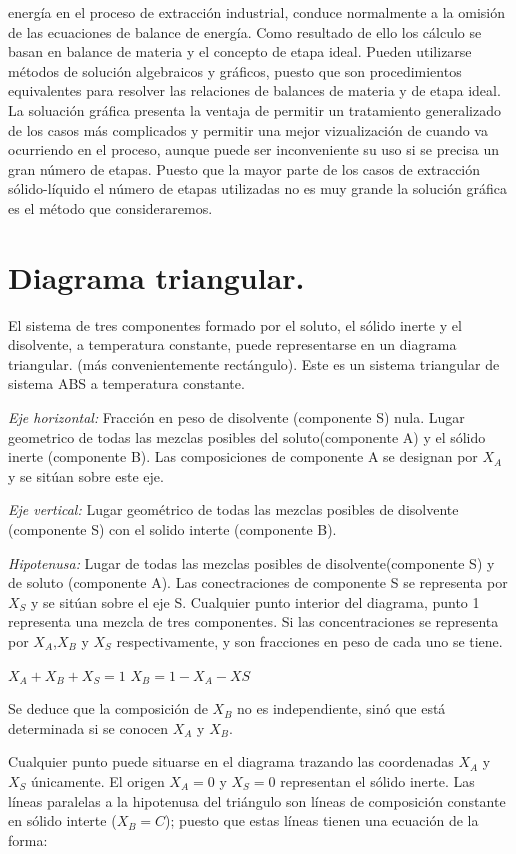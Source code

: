 \documentclass[12pt,openany]{book}
\begin{document}
energía en el proceso de extracción industrial, conduce normalmente a la omisión de las 
ecuaciones de balance de energía. Como resultado de ello los cálculo se basan en balance de materia y el concepto de etapa ideal.
Pueden utilizarse métodos de solución algebraicos y gráficos, puesto que son procedimientos equivalentes para resolver las relaciones de balances de materia y de etapa ideal.
La soluación gráfica presenta la ventaja de permitir un tratamiento generalizado de los casos más complicados y permitir una mejor vizualización de cuando va ocurriendo en el proceso,
aunque puede ser inconveniente su uso si se precisa un gran número de etapas. Puesto que la mayor parte de los casos de extracción sólido-líquido el 
número de etapas utilizadas no es muy grande la solución gráfica es el método que consideraremos.
\section{Diagrama triangular.}
El sistema de tres componentes formado por el soluto, el sólido inerte y el disolvente, a temperatura constante, puede representarse en un diagrama triangular.
(más convenientemente rectángulo).
Este es un sistema triangular de sistema ABS a temperatura constante.

\textit{Eje horizontal:} Fracción en peso de disolvente (componente S) nula. Lugar geometrico de todas las mezclas posibles del soluto(componente A) y el sólido inerte 
(componente B). Las composiciones de componente A se designan por $X_A$ y se sitúan sobre este eje.

\textit{Eje vertical:} Lugar geométrico de todas las mezclas posibles de disolvente (componente S) con el solido interte (componente B).

\textit{Hipotenusa:} Lugar de todas las mezclas posibles de disolvente(componente S) y de soluto (componente A). Las conectraciones de componente S se 
representa por $X_S$ y se sitúan sobre el eje S.
Cualquier punto interior del diagrama, punto 1 representa una mezcla de tres componentes. Si las concentraciones se representa por $X_A$,$X_B$ y $X_S$ respectivamente, 
y son fracciones en peso de cada uno se tiene.

$X_A+X_B+X_S=1$
$X_B=1-X_A-XS$

Se deduce que la composición de $X_B$ no es independiente, sinó que está determinada si se conocen $X_A$ y $X_B$.

Cualquier punto puede situarse en el diagrama trazando las coordenadas $X_A$ y $X_S$ únicamente. El origen $X_A=0$ y $X_S=0$ representan el sólido inerte. Las 
líneas paralelas a la hipotenusa del triángulo son líneas de composición constante en sólido interte ($X_B=C$); puesto que estas líneas tienen una ecuación de la forma:
\end{document}

